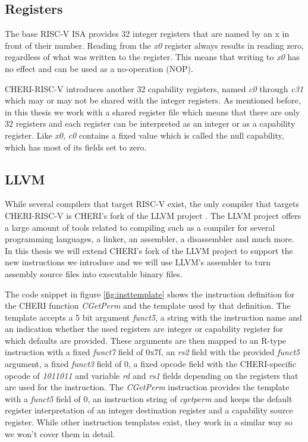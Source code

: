 \subsection{Registers}
The base RISC-V ISA provides 32 integer registers that are named by an x in front of their number.
Reading from the \textit{x0} register always results in reading zero, regardless of what was written to the register.
This means that writing to \textit{x0} has no effect and can be used as a no-operation (NOP).

CHERI-RISC-V introduces another 32 capability registers, named \textit{c0} through \textit{c31} which may or may not be shared with the integer registers.
As mentioned before, in this thesis we work with a shared register file which means that there are only 32 registers and each register can be interpreted as an integer or as a capability register.
Like \textit{x0}, \textit{c0} contains a fixed value which is called the null capability, which has most of its fields set to zero.


\subsection{LLVM}
\label{sec:llvm_background}
While several compilers that target RISC-V exist, the only compiler that targets CHERI-RISC-V is CHERI's fork of the LLVM project \cite{cherillvm}.
The LLVM project offers a large amount of tools related to compiling such as a compiler for several programming languages, a linker, an assembler, a disassembler and much more.
In this thesis we will extend CHERI's fork of the LLVM project to support the new instructions we introduce and we will use LLVM's assembler to turn assembly source files into executable binary files.

The code snippet in figure \ref{fig:insttemplate} shows the instruction definition for the CHERI function \textit{CGetPerm} and the template used by that definition.
The template accepts a 5 bit argument \textit{funct5}, a string with the instruction name and an indication whether the used registers are integer or capability register for which defaults are provided.
These arguments are then mapped to an R-type instruction with a fixed \textit{funct7} field of 0x7f, an \textit{rs2} field with the provided \textit{funct5} argument, a fixed \textit{funct3} field of 0, a fixed opcode field with the CHERI-specific opcode of \textit{1011011} and variable \textit{rd} and \textit{rs1} fields depending on the registers that are used for the instruction.
The \textit{CGetPerm} instruction provides the template with a \textit{funct5} field of 0, an instruction string of \textit{cgetperm} and keeps the default register interpretation of an integer destination register and a capability source register.
While other instruction templates exist, they work in a similar way so we won't cover them in detail.

